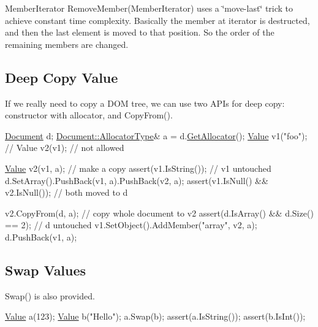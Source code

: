 {\ttfamily Member\+Iterator Remove\+Member(\+Member\+Iterator)} uses a \char`\"{}move-\/last\char`\"{} trick to achieve constant time complexity. Basically the member at iterator is destructed, and then the last element is moved to that position. So the order of the remaining members are changed.\hypertarget{md_Cadriciel_Commun_Externe_RapidJSON_doc_tutorial.zh-cn_DeepCopyValue}{}\subsection{Deep Copy Value}\label{md_Cadriciel_Commun_Externe_RapidJSON_doc_tutorial.zh-cn_DeepCopyValue}
If we really need to copy a D\+OM tree, we can use two A\+P\+Is for deep copy\+: constructor with allocator, and {\ttfamily Copy\+From()}.


\begin{DoxyCode}
\hyperlink{class_generic_document}{Document} d;
\hyperlink{class_generic_document_a35155b912da66ced38d22e2551364c57}{Document::AllocatorType}& a = d.\hyperlink{class_generic_document_aa4609d6b19f86aec1a6b96edf2c27686}{GetAllocator}();
\hyperlink{class_generic_value}{Value} v1(\textcolor{stringliteral}{"foo"});
\textcolor{comment}{// Value v2(v1); // not allowed}

\hyperlink{class_generic_value}{Value} v2(v1, a);                      \textcolor{comment}{// make a copy}
assert(v1.IsString());                \textcolor{comment}{// v1 untouched}
d.SetArray().PushBack(v1, a).PushBack(v2, a);
assert(v1.IsNull() && v2.IsNull());   \textcolor{comment}{// both moved to d}

v2.CopyFrom(d, a);                    \textcolor{comment}{// copy whole document to v2}
assert(d.IsArray() && d.Size() == 2); \textcolor{comment}{// d untouched}
v1.SetObject().AddMember(\textcolor{stringliteral}{"array"}, v2, a);
d.PushBack(v1, a);
\end{DoxyCode}
\hypertarget{md_Cadriciel_Commun_Externe_RapidJSON_doc_tutorial.zh-cn_SwapValues}{}\subsection{Swap Values}\label{md_Cadriciel_Commun_Externe_RapidJSON_doc_tutorial.zh-cn_SwapValues}
{\ttfamily Swap()} is also provided.


\begin{DoxyCode}
\hyperlink{class_generic_value}{Value} a(123);
\hyperlink{class_generic_value}{Value} b(\textcolor{stringliteral}{"Hello"});
a.Swap(b);
assert(a.IsString());
assert(b.IsInt());
\end{DoxyCode}


